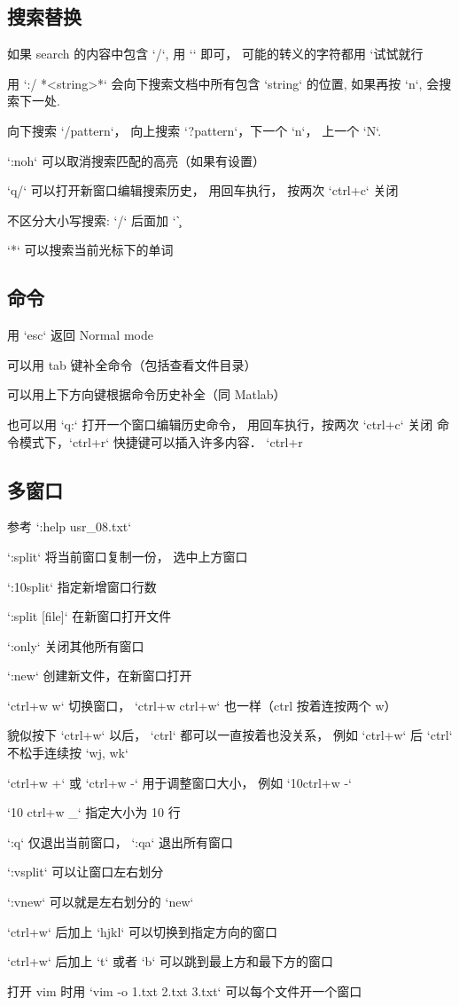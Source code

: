 \subsection{搜索替换}
\item 如果 search 的内容中包含 `/`, 用 `\/` 即可， 可能的转义的字符都用 `\` 试试就行
\item 用 `:/ *<string>*` 会向下搜索文档中所有包含 `string` 的位置, 如果再按 `n`, 会搜索下一处. 
\item 向下搜索 `/pattern`， 向上搜索 `?pattern`，下一个 `n`， 上一个 `N`.
\item `:noh` 可以取消搜索匹配的高亮（如果有设置）
\item `q/` 可以打开新窗口编辑搜索历史， 用回车执行， 按两次 `ctrl+c` 关闭
\item 不区分大小写搜索:  `/` 后面加 `\c`
\item `*` 可以搜索当前光标下的单词

\subsection{命令}
\item 用 `esc` 返回 Normal mode
\item 可以用 tab 键补全命令（包括查看文件目录）
\item 可以用上下方向键根据命令历史补全（同 Matlab）
\item 也可以用 `q:` 打开一个窗口编辑历史命令， 用回车执行，按两次 `ctrl+c` 关闭
命令模式下，`ctrl+r` 快捷键可以插入许多内容． `ctrl+r %

\subsection{多窗口}
\item 参考 `:help usr_08.txt`
\item `:split` 将当前窗口复制一份， 选中上方窗口
\item `:10split` 指定新增窗口行数
\item `:split [file]` 在新窗口打开文件
\item `:only` 关闭其他所有窗口
\item `:new` 创建新文件，在新窗口打开
\item `ctrl+w w` 切换窗口， `ctrl+w ctrl+w` 也一样（ctrl 按着连按两个 w）
\item 貌似按下 `ctrl+w` 以后， `ctrl` 都可以一直按着也没关系， 例如 `ctrl+w` 后 `ctrl` 不松手连续按 `wj, wk`
\item `ctrl+w +` 或 `ctrl+w -` 用于调整窗口大小， 例如 `10ctrl+w -`
\item `10 ctrl+w _` 指定大小为 10 行
\item `:q` 仅退出当前窗口， `:qa` 退出所有窗口
\item `:vsplit` 可以让窗口左右划分
\item `:vnew` 可以就是左右划分的 `new`
\item `ctrl+w` 后加上 `hjkl` 可以切换到指定方向的窗口
\item `ctrl+w` 后加上 `t` 或者 `b` 可以跳到最上方和最下方的窗口
\item 打开 vim 时用 `vim -o 1.txt 2.txt 3.txt` 可以每个文件开一个窗口

